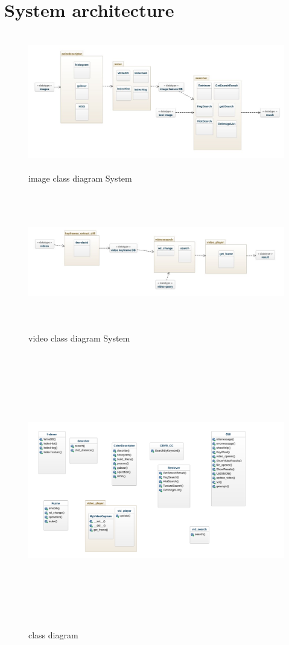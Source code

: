 \documentclass[pdftex,10pt,a4paper,oneside]{article}
\begin{document}
	\section{System architecture}
	
	\begin{figure}[H]
		\centering
		\includegraphics[width=120mm,height=60mm]{fig/0.png}
		\caption{image class diagram System}
		\label{image class diagram System}
	\end{figure}
\begin{figure}[H]
	\centering
	\includegraphics[width=120mm,height=60mm]{fig/1.png}
	\caption{video class diagram System  }
	\label{video class diagram System}
\end{figure}
\begin{figure}[H]
	\centering
	\includegraphics[width=140mm,height=120mm]{fig/33.png}
	\caption{class diagram }
	\label{class diagram }
\end{figure}
\pagebreak
\end{document}
